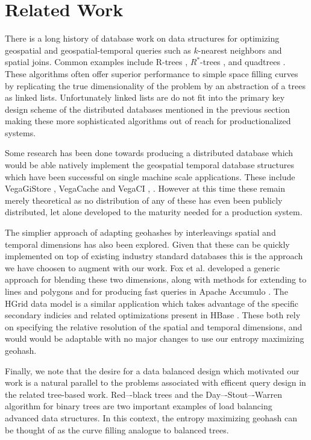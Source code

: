 \documentclass[nips13submit_09,times,art10]{article} %
\begin{document}
\section{Related Work} \label{sec:related}

There is a long history of database work on data structures for
optimizing geospatial and geospatial-temporal queries such
as $k$-nearest neighbors and spatial joins. Common examples
include R-trees \cite{guttman1984r},
$R^{*}$-trees \cite{beckmann1990r}, and quadtrees \cite{samet1985storing}.
These algorithms often offer superior performance to simple space filling
curves by replicating the true dimensionality of the problem by an abstraction
of a trees as linked lists. Unfortunately linked lists are do not fit into
the primary key design scheme of the distributed databases mentioned in
the previous section making these more sophisticated algorithms out of
reach for productionalized systems.

Some research has been done towards producing a distributed database which would
be able natively implement the geospatial temporal database structures which have been successful
on single machine scale applications. These include VegaGiStore \cite{zhong2012towards},
VegaCache \cite{zhong2013vegacache} and VegaCI \cite{zhong2012distributed}, \cite{zhong2012elastic}.
However at this time these remain merely theoretical as no distribution of any of these
has even been publicly distributed, let alone developed to the maturity needed for a
production system.

The simplier approach of adapting geohashes by interleavings spatial and temporal dimensions
has also been explored. Given that these can be quickly implemented on top of existing industry
standard databases this is the approach we have choosen to augment with our work. Fox et al.
developed a generic approach for blending these two dimensions, along with methods for
extending to lines and polygons and for producing fast queries in Apache Accumulo \cite{fox2013spatio}.
The HGrid data model is a similar application which takes advantage of the specific secondary
indicies and related optimizations present in HBase \cite{han2013hgrid}. These both rely on
specifying the relative resolution of the spatial and temporal dimensions, and would would be
adaptable with no major changes to use our entropy maximizing geohash.

Finally, we note that the desire for a data balanced design which motivated our work is a
natural parallel to the problems associated with efficent query design in the
related tree-based work. Red–-black trees \cite{bayer1972symmetric} and the
Day–-Stout–-Warren algorithm for binary trees \cite{stout1986tree} are two important examples
of load balancing advanced data structures.
In this context, the entropy maximizing geohash can be thought of as the curve filling
analogue to balanced trees.
\end{document}
